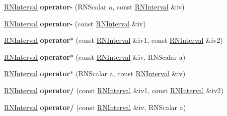 \begin{DoxyCompactItemize}
\item 
\hyperlink{class_r_n_interval}{R\+N\+Interval} {\bfseries operator-\/} (R\+N\+Scalar a, const \hyperlink{class_r_n_interval}{R\+N\+Interval} \&iv)\hypertarget{class_r_n_interval_a70ec7b64a2abacf7ff62c0c9cd040c47}{}\label{class_r_n_interval_a70ec7b64a2abacf7ff62c0c9cd040c47}

\item 
\hyperlink{class_r_n_interval}{R\+N\+Interval} {\bfseries operator-\/} (const \hyperlink{class_r_n_interval}{R\+N\+Interval} \&iv)\hypertarget{class_r_n_interval_afc725341b495c44351aaab3b7f2ebd75}{}\label{class_r_n_interval_afc725341b495c44351aaab3b7f2ebd75}

\item 
\hyperlink{class_r_n_interval}{R\+N\+Interval} {\bfseries operator$\ast$} (const \hyperlink{class_r_n_interval}{R\+N\+Interval} \&iv1, const \hyperlink{class_r_n_interval}{R\+N\+Interval} \&iv2)\hypertarget{class_r_n_interval_a55f5fc5e1cc25fffab6045b26ed9daef}{}\label{class_r_n_interval_a55f5fc5e1cc25fffab6045b26ed9daef}

\item 
\hyperlink{class_r_n_interval}{R\+N\+Interval} {\bfseries operator$\ast$} (const \hyperlink{class_r_n_interval}{R\+N\+Interval} \&iv, R\+N\+Scalar a)\hypertarget{class_r_n_interval_ac91796d3c6b82936ab818c5ae9bd65a9}{}\label{class_r_n_interval_ac91796d3c6b82936ab818c5ae9bd65a9}

\item 
\hyperlink{class_r_n_interval}{R\+N\+Interval} {\bfseries operator$\ast$} (R\+N\+Scalar a, const \hyperlink{class_r_n_interval}{R\+N\+Interval} \&iv)\hypertarget{class_r_n_interval_a5834b78e260f8446760272d9f83473f0}{}\label{class_r_n_interval_a5834b78e260f8446760272d9f83473f0}

\item 
\hyperlink{class_r_n_interval}{R\+N\+Interval} {\bfseries operator/} (const \hyperlink{class_r_n_interval}{R\+N\+Interval} \&iv1, const \hyperlink{class_r_n_interval}{R\+N\+Interval} \&iv2)\hypertarget{class_r_n_interval_a399232bdf58f864f87a0219cdd04cc33}{}\label{class_r_n_interval_a399232bdf58f864f87a0219cdd04cc33}

\item 
\hyperlink{class_r_n_interval}{R\+N\+Interval} {\bfseries operator/} (const \hyperlink{class_r_n_interval}{R\+N\+Interval} \&iv, R\+N\+Scalar a)\hypertarget{class_r_n_interval_acf63c7b856b49f3082547ab58d988949}{}\label{class_r_n_interval_acf63c7b856b49f3082547ab58d988949}


\end{DoxyCompactItemize}
